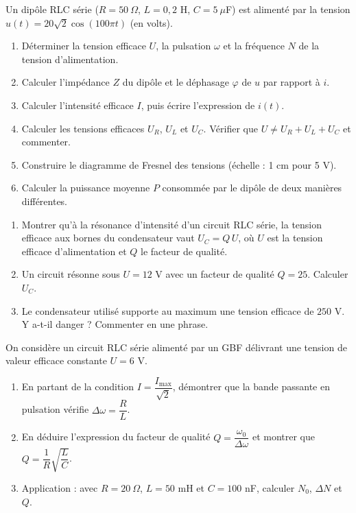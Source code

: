 \documentclass[11pt]{article}
\newcounter{popsec}
\newcounter{popsub}
\newcommand{\courssub}[1]{%
  \stepcounter{popsub}%
  \par\vspace{9pt}\noindent{\popxbold\fontsize{11.5}{13}\selectfont\color{popink}{\color{poporange}\thepopsec.\thepopsub}\hspace{6pt}#1}\par\nopagebreak\vspace{4pt}
}
\begin{document}
\courssub{Je m'entraîne}

\begin{exercice}
Un dipôle RLC série ($R = 50\ \Omega$, $L = 0{,}2$ H, $C = 5\ \mu$F) est alimenté par la tension $u(t) = 20\sqrt{2}\cos(100\pi t)$ (en volts).
\begin{enumerate}
\item Déterminer la tension efficace $U$, la pulsation $\omega$ et la fréquence $N$ de la tension d'alimentation.
\item Calculer l'impédance $Z$ du dipôle et le déphasage $\varphi$ de $u$ par rapport à $i$.
\item Calculer l'intensité efficace $I$, puis écrire l'expression de $i(t)$.
\item Calculer les tensions efficaces $U_R$, $U_L$ et $U_C$. Vérifier que $U \neq U_R + U_L + U_C$ et commenter.
\item Construire le diagramme de Fresnel des tensions (échelle : 1 cm pour 5 V).
\item Calculer la puissance moyenne $P$ consommée par le dipôle de deux manières différentes.
\end{enumerate}
\end{exercice}

\begin{exercice}
\begin{enumerate}
\item Montrer qu'à la résonance d'intensité d'un circuit RLC série, la tension efficace aux bornes du condensateur vaut $U_C = Q\,U$, où $U$ est la tension efficace d'alimentation et $Q$ le facteur de qualité.
\item Un circuit résonne sous $U = 12$ V avec un facteur de qualité $Q = 25$. Calculer $U_C$.
\item Le condensateur utilisé supporte au maximum une tension efficace de $250$ V. Y a-t-il danger ? Commenter en une phrase.
\end{enumerate}
\end{exercice}

\begin{exercice}
On considère un circuit RLC série alimenté par un GBF délivrant une tension de valeur efficace constante $U = 6$ V.
\begin{enumerate}
\item En partant de la condition $I = \dfrac{I_{\max}}{\sqrt{2}}$, démontrer que la bande passante en pulsation vérifie $\Delta\omega = \dfrac{R}{L}$.
\item En déduire l'expression du facteur de qualité $Q = \dfrac{\omega_0}{\Delta\omega}$ et montrer que $Q = \dfrac{1}{R}\sqrt{\dfrac{L}{C}}$.
\item Application : avec $R = 20\ \Omega$, $L = 50$ mH et $C = 100$ nF, calculer $N_0$, $\Delta N$ et $Q$.
\end{enumerate}
\end{exercice}
\end{document}
